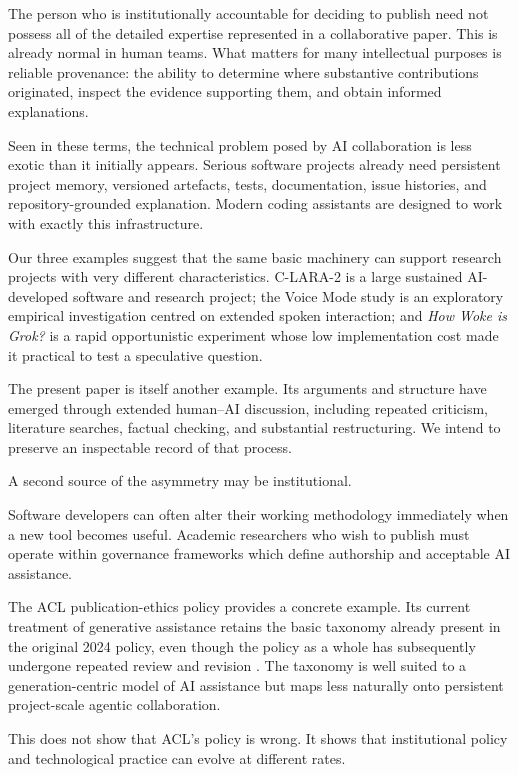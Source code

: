 The person who is institutionally accountable for deciding to publish need not possess all of the detailed expertise represented in a collaborative paper. This is already normal in human teams. What matters for many intellectual purposes is reliable provenance: the ability to determine where substantive contributions originated, inspect the evidence supporting them, and obtain informed explanations.

Seen in these terms, the technical problem posed by AI collaboration is less exotic than it initially appears. Serious software projects already need persistent project memory, versioned artefacts, tests, documentation, issue histories, and repository-grounded explanation. Modern coding assistants are designed to work with exactly this infrastructure.

Our three examples suggest that the same basic machinery can support research projects with very different characteristics. C-LARA-2 is a large sustained AI-developed software and research project; the Voice Mode study is an exploratory empirical investigation centred on extended spoken interaction; and \emph{How Woke is Grok?} is a rapid opportunistic experiment whose low implementation cost made it practical to test a speculative question.

The present paper is itself another example. Its arguments and structure have emerged through extended human--AI discussion, including repeated criticism, literature searches, factual checking, and substantial restructuring. We intend to preserve an inspectable record of that process.

A second source of the asymmetry may be institutional.

Software developers can often alter their working methodology immediately when a new tool becomes useful. Academic researchers who wish to publish must operate within governance frameworks which define authorship and acceptable AI assistance.

The ACL publication-ethics policy provides a concrete example. Its current treatment of generative assistance retains the basic taxonomy already present in the original 2024 policy, even though the policy as a whole has subsequently undergone repeated review and revision \citep{acl2024policy,acl2026policy,aclresolutions2025}. The taxonomy is well suited to a generation-centric model of AI assistance but maps less naturally onto persistent project-scale agentic collaboration.

This does not show that ACL's policy is wrong. It shows that institutional policy and technological practice can evolve at different rates.

